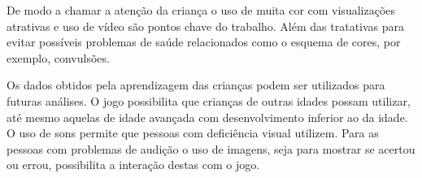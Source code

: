 \documentclass{sigchi}
\begin{document}
De modo a chamar a atenção da criança o uso de muita cor com visualizações atrativas e uso de vídeo são pontos chave do trabalho. Além das tratativas para evitar possíveis problemas de saúde relacionados como o esquema de cores, por exemplo, convulsões.

Os dados obtidos pela aprendizagem das crianças podem ser utilizados para futuras análises. O jogo possibilita que crianças de outras idades possam utilizar, até mesmo aquelas de idade avançada com desenvolvimento inferior ao da idade. O uso de sons permite que pessoas com deficiência visual utilizem. Para as pessoas com problemas de audição o uso de imagens, seja para mostrar se acertou ou errou, possibilita a interação destas com o jogo.

\balance{}



\end{document}

